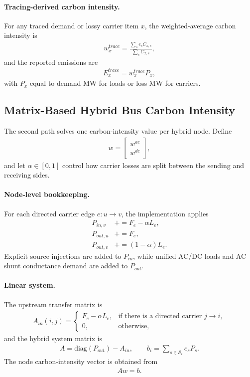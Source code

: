 \paragraph{Tracing-derived carbon intensity.}
For any traced demand or lossy carrier item \(x\), the weighted-average carbon
intensity is
\begin{align}
w_x^{trace} = \frac{\sum_s e_s C_{x,s}}{\sum_s C_{x,s}},
\end{align}
and the reported emissions are
\begin{align}
E_x^{trace} = w_x^{trace} P_x,
\end{align}
with \(P_x\) equal to demand MW for loads or loss MW for carriers.

\subsection{Matrix-Based Hybrid Bus Carbon Intensity}

The second path solves one carbon-intensity value per hybrid node.  Define
\begin{align}
w = \begin{bmatrix} w^{ac} \\ w^{dc} \end{bmatrix},
\end{align}
and let \(\alpha \in [0,1]\) control how carrier losses are split between the
sending and receiving sides.

\paragraph{Node-level bookkeeping.}
For each directed carrier edge \(e:u\rightarrow v\), the implementation applies
\begin{align}
P_{in,v} &\mathrel{+}= F_e - \alpha L_e, \\
P_{out,u} &\mathrel{+}= F_e, \\
P_{out,v} &\mathrel{+}= (1-\alpha)L_e.
\end{align}
Explicit source injections are added to \(P_{in}\), while unified AC/DC loads
and AC shunt conductance demand are added to \(P_{out}\).

\paragraph{Linear system.}
The upstream transfer matrix is
\begin{align}
A_{in}(i,j) =
\begin{cases}
F_e - \alpha L_e, & \text{if there is a directed carrier } j \rightarrow i, \\
0, & \text{otherwise},
\end{cases}
\end{align}
and the hybrid system matrix is
\begin{align}
A = \mathrm{diag}(P_{out}) - A_{in},
\qquad
b_i = \sum_{s \in \mathcal{S}_i} e_s P_s.
\end{align}
The node carbon-intensity vector is obtained from
\begin{align}
A w = b.
\end{align}

